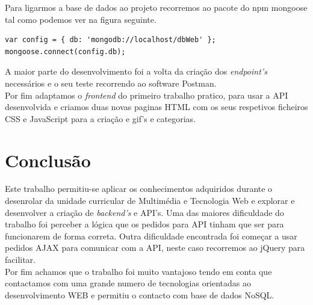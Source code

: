 \documentclass[11pt]{report}
\begin{document}
Para ligarmos a base de dados ao projeto recorremos ao pacote do npm mongoose tal como podemos ver na figura seguinte.

\medskip
\begin{lstlisting}[caption= Conexão a base de dados recorrendo ao mongoose.]
var config = { db: 'mongodb://localhost/dbWeb' };
mongoose.connect(config.db);
\end{lstlisting}

A maior parte do desenvolvimento foi a volta da criação dos \textit{endpoint's} necessários e o seu teste recorrendo ao software Postman. \\ Por fim adaptamos o \textit{frontend} do primeiro trabalho pratico, para usar a API desenvolvida e criamos duas novas paginas HTML com os seus respetivos ficheiros CSS e JavaScript para a criação e gif's e categorias.

\chapter*{Conclusão}

Este trabalho permitiu-se aplicar os conhecimentos adquiridos durante o desenrolar da unidade curricular de Multimédia e Tecnologia Web e explorar e desenvolver a criação de \textit{backend's} e API's. Uma das maiores dificuldade do trabalho foi perceber a lógica que os pedidos para API tinham que ser para funcionarem de forma correta. Outra dificuldade encontrada foi começar a usar pedidos AJAX para comunicar com a API, neste caso recorremos ao jQuery para facilitar. \\ Por fim achamos que o trabalho foi muito vantajoso tendo em conta que contactamos com uma grande numero de tecnologias orientadas ao desenvolvimento WEB  e permitiu o contacto com base de dados NoSQL.
\end{document}
